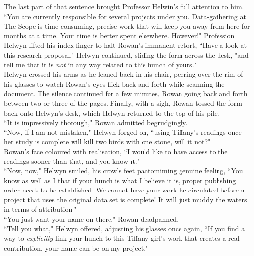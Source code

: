 The last part of that sentence brought Professor Helwin's full attention to him.\\
``You are currently responsible for several projects under you. Data-gathering at The Scope is time consuming, precise work that will keep you away from here for months at a time. Your time is better spent elsewhere. However!" Profession Helwyn lifted his index finger to halt Rowan's immanent retort, ``Have a look at this research proposal," Helwyn continued, sliding the form across the desk, "and tell me that it is \textit{not} in any way related to this hunch of yours."\\
Helwyn crossed his arms as he leaned back in his chair, peering over the rim of his glasses to watch Rowan's eyes flick back and forth while scanning the document.
The silence continued for a few minutes, Rowan going back and forth between two or three of the pages.
Finally, with a sigh, Rowan tossed the form back onto Helwyn's desk, which Helwyn returned to the top of his pile.\\

``It is impressively thorough," Rowan admitted begrudgingly.\\
``Now, if I am not mistaken," Helwyn forged on, ``using Tiffany's readings once her study is complete will kill two birds with one stone, will it not?"\\
Rowan's face coloured with realisation, ``I would like to have access to the readings sooner than that, and you know it."\\
``Now, now," Helwyn smiled, his crow's feet pantomiming genuine feeling, ``You know as well as I that if your hunch is what I believe it is, proper publishing order needs to be established. We cannot have your work be circulated before a project that uses the original data set is complete! It will just muddy the waters in terms of attribution."\\
``You just want your name on there." Rowan deadpanned.\\
``Tell you what," Helwyn offered, adjusting his glasses once again, ``If you find a way to \textit{explicitly} link your hunch to this Tiffany girl's work that creates a real contribution, your name can be on my project."\\
  
